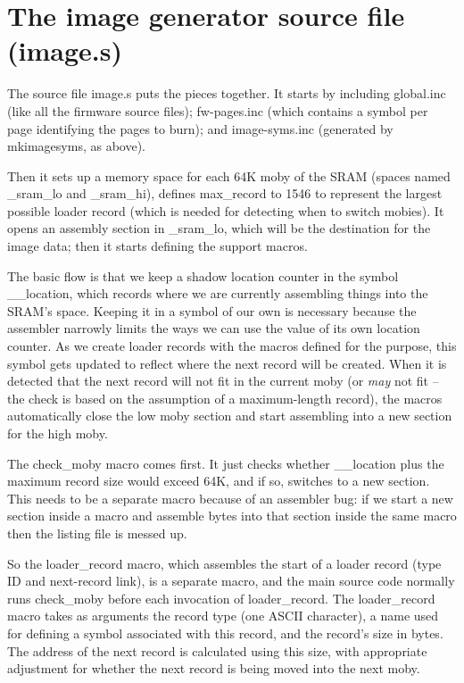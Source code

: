 \section{The image generator source file (image.s)}

The source file image.s puts the pieces together.  It starts by including
global.inc (like all the firmware source files); fw-pages.inc (which
contains a symbol per page identifying the pages to burn); and
image-syms.inc (generated by mkimagesyms, as above).

Then it sets up a memory space for each 64K moby of the SRAM (spaces named
\_sram\_lo and \_sram\_hi), defines max\_record to 1546 to represent the
largest possible loader record (which is needed for detecting when to switch
mobies).  It opens an assembly section in \_sram\_lo, which will be the
destination for the image data; then it starts defining the support macros.

The basic flow is that we keep a shadow location counter in the symbol
\_\_location, which records where we are currently assembling things into
the SRAM's space.  Keeping it in a symbol of our own is necessary because
the assembler narrowly limits the ways we can use the value of its own
location counter.  As we create loader records with the macros defined for
the purpose, this symbol gets updated to reflect where the next record will
be created.  When it is detected that the next record will not fit in the
current moby (or \emph{may} not fit -- the check is based on the assumption
of a maximum-length record), the macros automatically close the low moby
section and start assembling into a new section for the high moby.

The check\_moby macro comes first.  It just checks whether \_\_location plus
the maximum record size would exceed 64K, and if so, switches to a new
section.  This needs to be a separate macro because of an assembler bug:  if
we start a new section inside a macro and assemble bytes into that section
inside the same macro then the listing file is messed up.

So the loader\_record macro, which assembles the start of a loader record
(type ID and next-record link), is a separate macro, and the main source
code normally runs check\_moby before each invocation of loader\_record. 
The loader\_record macro takes as arguments the record type (one ASCII
character), a name used for defining a symbol associated with this record,
and the record's size in bytes.  The address of the next record is
calculated using this size, with appropriate adjustment for whether the next
record is being moved into the next moby.

